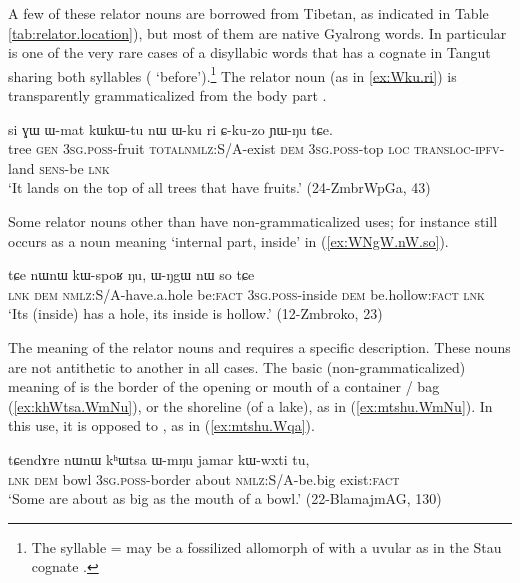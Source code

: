 A few of these relator nouns are borrowed from Tibetan, as indicated in Table \ref{tab:relator.location}), but most of them are native Gyalrong words. In particular  is one of the very rare cases of a disyllabic words that has a cognate in Tangut sharing both syllables ( `before').\footnote{The syllable  =  may be a fossilized allomorph of  with a uvular as in the Stau cognate .} The relator noun  (as in \ref{ex:Wku.ri}) is transparently grammaticalized from the body part .

\begin{exe}
\ex \label{ex:Wku.ri}
 \gll si ɣɯ ɯ-mat kɯ\redp{}kɯ-tu nɯ ɯ-ku ri ɕ-ku-zo ɲɯ-ŋu tɕe. \\
 tree \textsc{gen} \textsc{3sg}.\textsc{poss}-fruit \textsc{total}\redp{}\textsc{nmlz}:S/A-exist \textsc{dem} \textsc{3sg}.\textsc{poss}-top \textsc{loc} \textsc{transloc}-\textsc{ipfv}-land \textsc{sens}-be \textsc{lnk} \\
 \glt `It lands on the top of all trees that have fruits.' (24-ZmbrWpGa, 43)
\end{exe}

Some relator nouns other than  have non-grammaticalized uses; for instance  still occurs as a noun meaning  `internal part, inside' in (\ref{ex:WNgW.nW.so}).

\begin{exe}
\ex \label{ex:WNgW.nW.so}
 \gll tɕe nɯnɯ kɯ-spoʁ ŋu, ɯ-ŋgɯ nɯ so tɕe  \\
 \textsc{lnk} \textsc{dem} \textsc{nmlz}:S/A-have.a.hole be:\textsc{fact} \textsc{3sg}.\textsc{poss}-inside \textsc{dem} be.hollow:\textsc{fact} \textsc{lnk} \\
 \glt `Its (inside) has a hole, its inside is hollow.' (12-Zmbroko, 23)
\end{exe}

The meaning of the relator nouns  and  requires a specific description. These nouns are not antithetic to another in all cases. The basic (non-grammaticalized) meaning of    is the border of the opening or mouth of a container / bag (\ref{ex:khWtsa.WmNu}), or the shoreline (of a lake), as in (\ref{ex:mtshu.WmNu}). In this use, it is opposed to , as in (\ref{ex:mtshu.Wqa}).

\begin{exe}
\ex \label{ex:khWtsa.WmNu}
\gll  tɕendɤre nɯnɯ kʰɯtsa ɯ-mŋu jamar kɯ-wxti tu,\\
\textsc{lnk} \textsc{dem} bowl \textsc{3sg}.\textsc{poss}-border about \textsc{nmlz}:S/A-be.big exist:\textsc{fact}\\
\glt  `Some are about as big as the mouth of a bowl.' (22-BlamajmAG, 130)
\end{exe}

